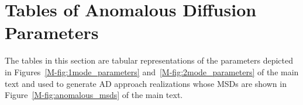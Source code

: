 \documentclass{article}
\begin{document}
  


 
  
  \clearpage 

  \section{Tables of Anomalous Diffusion Parameters}\label{section:tabular_AD_params}

  The tables in this section are tabular representations of the parameters depicted in
  Figures~\ref{M-fig:1mode_parameters} and~\ref{M-fig:2mode_parameters} of the main text
  and used to generate AD approach realizations whose MSDs are shown in Figure~\ref{M-fig:anomalous_msds}
  of the main text.
  
\end{document}
